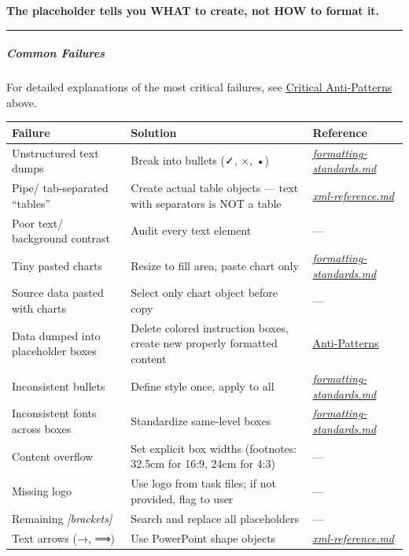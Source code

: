 \documentclass[11pt]{article}
\begin{document}
\textbf{The placeholder tells you WHAT to create, not HOW to format it.}


\vspace{0.5em}\hrule\vspace{0.5em}

\subparagraph{Common Failures}\mbox{}\par

For detailed explanations of the most critical failures, see \href{\#critical-anti-patterns-never-do-these}{Critical Anti-Patterns} above.


\begingroup
\small
\setlength{\tabcolsep}{2pt}
\begin{longtable}{>{\RaggedRight\arraybackslash\hspace{0pt}}p{}>{\RaggedRight\arraybackslash\hspace{0pt}}p{}>{\RaggedRight\arraybackslash\hspace{0pt}}p{}}
\toprule
{} \textbf{Failure} & \textbf{Solution} & \textbf{Reference} \\
\midrule
{} Unstructured text dumps & Break into bullets (✓, ×, •) & \href{reference/ formatting-standards.md\#bullet-point-structure}{\emph{formatting-standards.md}} \\
{} Pipe/ tab-separated ``tables'' & Create actual table objects — text with separators is NOT a table & \href{reference/ xml-reference.md\#table-implementation}{\emph{xml-reference.md}} \\
{} Poor text/ background contrast & Audit every text element & — \\
{} Tiny pasted charts & Resize to fill area, paste chart only & \href{reference/ formatting-standards.md\#proper-sizing-workflow}{\emph{formatting-standards.md}} \\
{} Source data pasted with charts & Select only chart object before copy & — \\
{} Data dumped into placeholder boxes & Delete colored instruction boxes, create new properly formatted content & \href{\#critical-anti-patterns-never-do-these}{Anti-Patterns} \\
{} Inconsistent bullets & Define style once, apply to all & \href{reference/ formatting-standards.md\#bullet-consistency}{\emph{formatting-standards.md}} \\
{} Inconsistent fonts across boxes & Standardize same-level boxes & \href{reference/ formatting-standards.md\#font-consistency}{\emph{formatting-standards.md}} \\
{} Content overflow & Set explicit box widths (footnotes: 32.5cm for 16:9, 24cm for 4:3) & — \\
{} Missing logo & Use logo from task files; if not provided, flag to user & — \\
{} Remaining \emph{[brackets]} & Search and replace all placeholders & — \\
{} Text arrows (→, ⟹) & Use PowerPoint shape objects & \href{reference/ xml-reference.md\#arrow-shapes}{\emph{xml-reference.md}} \\
\bottomrule
\end{longtable}
\endgroup
\end{document}
